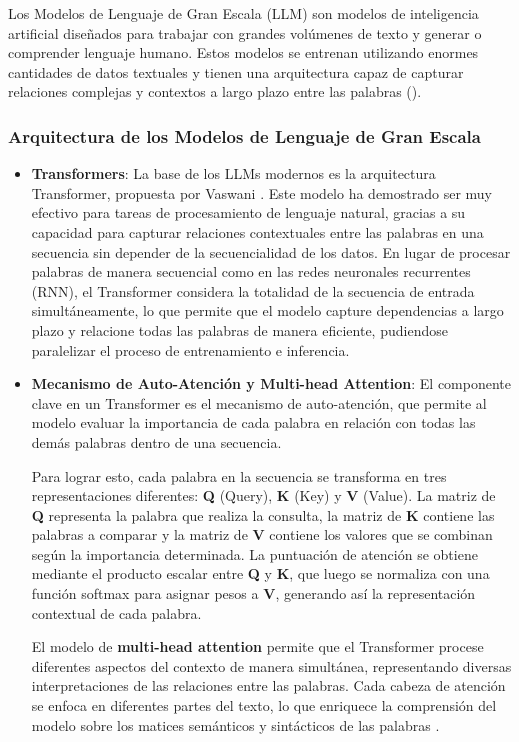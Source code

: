 \documentclass[../main.tex]{subfiles}
\begin{document}
Los Modelos de Lenguaje de Gran Escala (LLM) son modelos de inteligencia artificial diseñados para trabajar con grandes volúmenes de texto y generar o comprender lenguaje humano. Estos modelos se entrenan utilizando enormes cantidades de datos textuales y tienen una arquitectura capaz de capturar relaciones complejas y contextos a largo plazo entre las palabras (\cite{zhao2023survey}). 

\subsubsection{Arquitectura de los Modelos de Lenguaje de Gran Escala}
\begin{itemize}
    \item \textbf{Transformers}:
La base de los LLMs modernos es la arquitectura Transformer, propuesta por Vaswani \parencite{vaswani2017attention}. Este modelo ha demostrado ser muy efectivo para tareas de procesamiento de lenguaje natural, gracias a su capacidad para capturar relaciones contextuales entre las palabras en una secuencia sin depender de la secuencialidad de los datos. En lugar de procesar palabras de manera secuencial como en las redes neuronales recurrentes (RNN), el Transformer considera la totalidad de la secuencia de entrada simultáneamente, lo que permite que el modelo capture dependencias a largo plazo y relacione todas las palabras de manera eficiente, pudiendose paralelizar el proceso de entrenamiento e inferencia.

  \item \textbf{Mecanismo de Auto-Atención y Multi-head Attention}:
El componente clave en un Transformer es el mecanismo de auto-atención, que permite al modelo evaluar la importancia de cada palabra en relación con todas las demás palabras dentro de una secuencia.

Para lograr esto, cada palabra en la secuencia se transforma en tres representaciones diferentes: \textbf{Q} (Query), \textbf{K} (Key) y \textbf{V} (Value). La matriz de \textbf{Q} representa la palabra que realiza la consulta, la matriz de \textbf{K} contiene las palabras a comparar y la matriz de \textbf{V} contiene los valores que se combinan según la importancia determinada. La puntuación de atención se obtiene mediante el producto escalar entre \textbf{Q} y \textbf{K}, que luego se normaliza con una función softmax para asignar pesos a \textbf{V}, generando así la representación contextual de cada palabra.

El modelo de \textbf{multi-head attention} permite que el Transformer procese diferentes aspectos del contexto de manera simultánea, representando diversas interpretaciones de las relaciones entre las palabras. Cada cabeza de atención se enfoca en diferentes partes del texto, lo que enriquece la comprensión del modelo sobre los matices semánticos y sintácticos de las palabras \parencite{chopra2013natural}.


\end{itemize}
\end{document}
